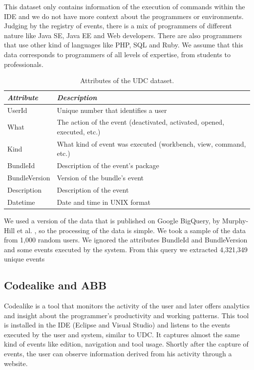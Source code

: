\documentclass[conference]{IEEEtran}
\begin{document}
This dataset only contains information of the execution of commands within the IDE and we do not have more context about the programmers or environments. Judging by the registry of events, there is a mix of programmers of different nature like Java SE, Java EE and Web developers. There are also programmers that use other kind of languages like PHP, SQL and Ruby. We assume that this data corresponds to programmers of all levels of expertise, from students to professionals.


\begin{table}[ht!]
	\small
	\caption{Attributes of the UDC dataset. }
	\label{tbl:att_udc}
	\centering
	\begin{tabular}{|p{1.5cm}|p{5cm}|} 
		\hline 
		\emph{Attribute} & \emph{Description} \\  
		\hline 
		\hline 
		UserId &  Unique number that identifies a user \\
		\hline
		What & The action of the event (deactivated, activated, opened, executed, etc.)  \\
		\hline
		Kind & What kind of event was executed (workbench, view, command, etc.)  \\
		\hline
		BundleId & Description of the event's package  \\
		\hline
		BundleVersion & Version of the bundle's event  \\
		\hline
		Description & Description of the event\\
		\hline
		Datetime & Date and time in UNIX format\\
		\hline
	\end{tabular}
	
\end{table}

We used a version of the data that is published on Google BigQuery, by Murphy-Hill et al. \cite{SnipesETALASD}, so the processing of the data is simple. We took a sample of the data from 1,000 random users. We ignored the attributes BundleId and BundleVersion and some events executed by the system. From this query we extracted 4,321,349 unique events

\subsection{Codealike and ABB}
Codealike \cite{CLQ15} is a tool that monitors the activity of the user and later offers analytics and insight about the programmer's productivity and working patterns. This tool is installed in the IDE (Eclipse and Visual Studio) and listens to the events executed by the user and system, similar to UDC. It captures almost the same kind of events like edition, navigation and tool usage. Shortly after the capture of events, the user can observe information derived from his activity through a website.
\end{document}
